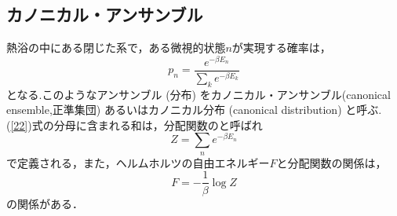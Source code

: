 \subsection{カノニカル・アンサンブル}
熱浴の中にある閉じた系で，ある微視的状態$n$が実現する確率は，
\begin{equation}
  \label{22}
  p_n=\frac{e^{-\beta E_n}}{\sum_{k}e^{-\beta E_k}}
\end{equation}
となる.このようなアンサンブル (分布) をカノニカル・アンサンブル(canonical ensemble,正準集団) あるいはカノニカル分布 (canonical distribution) と呼ぶ.(\ref{22})式の分母に含まれる和は，分配関数のと呼ばれ
\begin{equation}
  Z=\sum_{n}e^{-\beta E_n}
\end{equation}
で定義される，また，ヘルムホルツの自由エネルギー$F$と分配関数の関係は，
\begin{equation}
  F=-\frac{1}{\beta}\log Z
\end{equation}
の関係がある．

